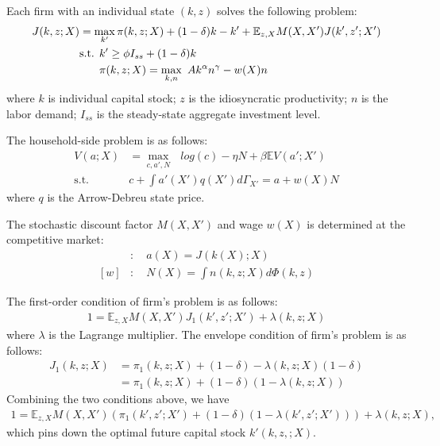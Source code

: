 Each firm with an individual state $(k,z)$ solves the following problem:
\begin{align*}
  J(k,z;X) &= \max_{k'} \pi(k,z;X) + (1-\delta)k -k' + \mathbb{E}_{z,X} M(X,X') J(k',z';X')
  \\
  &\text{s.t. } k' \geq \phi I_{ss} + (1-\delta)k 
  \\
  &\hphantom{\text{s.t. }} \pi(k,z;X) = \max_{k,n}\text{ } Ak^{\alpha}n^{\gamma} - w(X)n
\end{align*}
where $k$ is individual capital stock; $z$ is the idiosyncratic productivity; $n$ is the labor demand; $I_{ss}$ is the steady-state aggregate investment level.

The household-side problem is as follows:
\begin{align*}
  V(a;X) &= \max_{c,a',N}\text{ } log(c) - \eta N + \beta \mathbb{E}V(a';X')
  \\
  \text{s.t.}\quad& c + \int a'(X')q(X') d\Gamma_{X'} =  a + w(X)N
\end{align*}
where $q$ is the Arrow-Debreu state price.

The stochastic discount factor $M(X,X')$ and wage $w(X)$ is determined at the competitive market:
\begin{align*}
  [M]&:\quad a(X) = J(k(X);X)
  \\
  [w]&:\quad N(X) = \int n(k,z;X) d\Phi(k,z)
\end{align*}

The first-order condition of firm's problem is as follows:
\begin{align*}
  1 = \mathbb{E}_{z,X} M(X,X') J_{1}(k',z';X') + \lambda(k,z;X)
\end{align*}
where $\lambda$ is the Lagrange multiplier.
The envelope condition of firm's problem is as follows:
\begin{align*}
  J_{1}(k,z;X) 
  &= \pi_{1}(k,z;X) + (1-\delta) - \lambda(k,z;X)(1-\delta)
  \\
  &= \pi_{1}(k,z;X) + (1-\delta) (1 - \lambda(k,z;X))
\end{align*}
Combining the two conditions above, we have
\begin{align*}
  1 = \mathbb{E}_{z,X} M(X,X') (\pi_{1}(k',z';X') + (1-\delta) (1 - \lambda(k',z';X'))) + \lambda(k,z;X),
\end{align*}
which pins down the optimal future capital stock $k'(k,z,;X)$.
